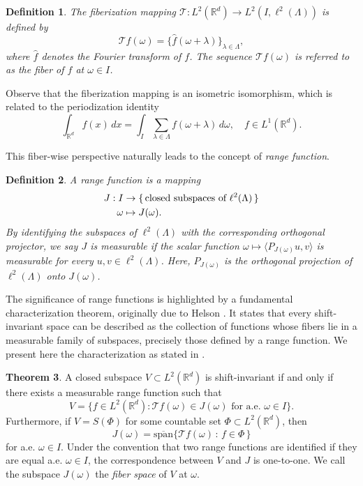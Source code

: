 \documentclass[a4paper,11pt]{amsart}
\newtheorem{fed}{Definition}[section]
\theoremstyle{definition}
\newtheorem{teo}[fed]{Theorem}
\theoremstyle{definition}
\def\la{\lambda}
\def\La{\Lambda}
\def\w{\omega}
\def\R{\mathbb{R}}
\begin{document}
	\begin{fed}\label{isometria}
		The fiberization mapping $\mathcal T: L^2(\mathbb R^d) \to L^2\left(I,\ell^2(\La)\right)$ is defined by
		$$
		\mathcal T f(\omega) = \{\hat{f} (\omega+\la) \}_{\la \in  \La},
		$$
		where $\hat{f}$ denotes the Fourier transform of $f$.
		The sequence $\mathcal T f(\omega)$ is referred to as the fiber of $f$ at $\omega \in I$. 
	\end{fed}
	
	Observe that the fiberization mapping is an isometric isomorphism, which is related to the periodization identity  
	$$
	\int_{\R^d} f(x) \,dx =  \int_{I} \sum_{\la\in\La} f(\w+\la)\,d\w, \quad  f\in L^1(\R^d).
	$$
	
	This fiber-wise perspective naturally leads to the concept of  \textit{range function}.
	
	\begin{fed}\label{range-function}
		A {\it range function} is a mapping
		\begin{align*}
			J:I&\rightarrow\{\text{\,closed subspaces of }\ell^2(\La)\,\}\\
			\omega&\mapsto J(\omega).
		\end{align*}
		By identifying the subspaces of $\ell^2(\La)$ with the corresponding orthogonal projector, we say $J$ is measurable if the scalar function $\omega\mapsto\langle P_{J(\omega)}u,v \rangle$ is measurable for every $u,v\in\ell^2(\La)$. Here, $P_{J(\omega)}$ is the orthogonal projection of $\ell^2(\La)$ onto $J(\omega)$. 
	\end{fed}
	
	
	The significance of range functions is highlighted by a fundamental characterization theorem, originally due to Helson \cite[Theorem 8]{He64}. It states that every shift-invariant space can be described as the collection of functions whose fibers lie in a measurable family of subspaces, precisely those defined by a range function. We present here the characterization as stated in \cite[Proposition 1.5]{B}.
	\begin{teo}\label{thm:characterization-sis}
		A closed subspace $V\subset L^{2}(\mathbb{R}^{d})$ is shift-invariant if and only if there exists a measurable range function such that
		\begin{equation}\label{eq: associated range function}
			V=\{f\in L^{2}(\mathbb{R}^{d}): \mathcal{T}f(\omega) \in J(\omega) \text{ for a.e. } \omega \in I\}.
		\end{equation}
		Furthermore, if $V=S(\Phi)$ for some coun\-table set $\Phi\subset L^2(\mathbb R^d)$, then 
		\begin{equation*}
			J(\omega) = \overline{\text{span}}\{\mathcal T f(\omega)\,:\,f\in\Phi\,\}
		\end{equation*} 
		for a.e. $\omega\in I$.
		Under the convention that two range functions are identified if they are equal a.e. $\omega\in I$, the correspondence between $V$ and $J$ is one-to-one. We call the subspace $J(\omega)$ the  \textit{fiber space} of $V$ at $\omega$. 
	\end{teo}
	
\end{document}
